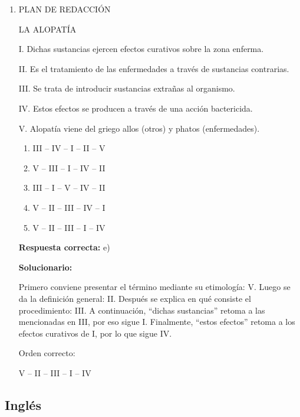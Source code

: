 \begin{enumerate}[resume]
	\vspace{6mm}
	
	
	
	\item PLAN DE REDACCIÓN
	
	LA ALOPATÍA
	
	I. Dichas sustancias ejercen efectos curativos sobre la zona enferma.
	
	II. Es el tratamiento de las enfermedades a través de sustancias contrarias.
	
	III. Se trata de introducir sustancias extrañas al organismo.
	
	IV. Estos efectos se producen a través de una acción bactericida.
	
	V. Alopatía viene del griego allos (otros) y phatos (enfermedades).
	
	\begin{enumerate}[label=\alph*)]
		\item III -- IV -- I -- II -- V
		\item V -- III -- I -- IV -- II
		\item III -- I -- V -- IV -- II
		\item V -- II -- III -- IV -- I
		\item V -- II -- III -- I -- IV
	\end{enumerate}
	\textbf{Respuesta correcta:} e)
	
	\vspace{2mm}
	\textbf{Solucionario:}
	
	Primero conviene presentar el término mediante su etimología: V.  
	Luego se da la definición general: II.  
	Después se explica en qué consiste el procedimiento: III.  
	A continuación, ``dichas sustancias'' retoma a las mencionadas en III, por eso sigue I.  
	Finalmente, ``estos efectos'' retoma a los efectos curativos de I, por lo que sigue IV.
	
	Orden correcto:
	
	V -- II -- III -- I -- IV
	
	\vspace{6mm}
	
\end{enumerate}

\subsection*{Inglés}

